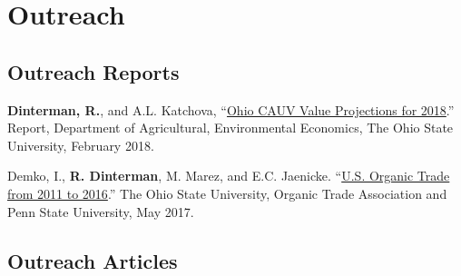 \documentclass[letterpaper]{article}
\renewenvironment{itemize}{
  \begin{list}{}{
    \setlength{\leftmargin}{1.5em}
  }
}{
  \end{list}
}
\begin{document}
\section*{Outreach}

\subsection*{Outreach Reports}

\begin{itemize}
\item \textbf{Dinterman, R.}, and A.L. Katchova, ``\href{https://aede.osu.edu/sites/aede/files/publication_files/2018CAUVProjectionsReport.pdf}{Ohio CAUV Value Projections for 2018}.'' Report, Department of Agricultural, Environmental Economics, The Ohio State University, February 2018.
\item Demko, I., \textbf{R. Dinterman}, M. Marez, and E.C. Jaenicke. ``\href{https://ota.com/sites/default/files/indexed_files/OTATradeReport_10-30-2017.pdf}{U.S. Organic Trade from 2011 to 2016}.'' The Ohio State University, Organic Trade Association and Penn State University, May 2017.
\end{itemize}

% 

\subsection*{Outreach Articles}
\end{document}
